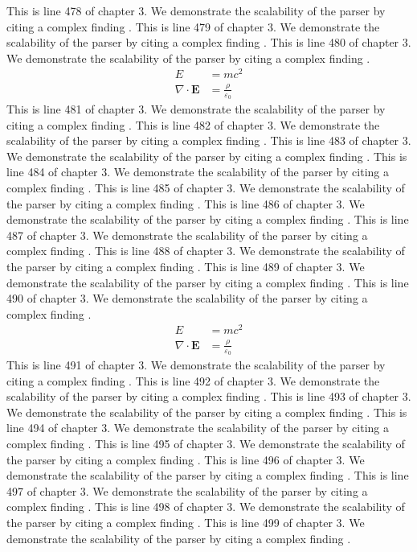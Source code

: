 This is line 478 of chapter 3. We demonstrate the scalability of the parser by citing a complex finding \cite{ref3_478}.
This is line 479 of chapter 3. We demonstrate the scalability of the parser by citing a complex finding \cite{ref3_479}.
This is line 480 of chapter 3. We demonstrate the scalability of the parser by citing a complex finding \cite{ref3_480}.
\begin{align*}
  E &= mc^2 \\
  \nabla \cdot \mathbf{E} &= \frac{\rho}{\varepsilon_0}
\end{align*}
This is line 481 of chapter 3. We demonstrate the scalability of the parser by citing a complex finding \cite{ref3_481}.
This is line 482 of chapter 3. We demonstrate the scalability of the parser by citing a complex finding \cite{ref3_482}.
This is line 483 of chapter 3. We demonstrate the scalability of the parser by citing a complex finding \cite{ref3_483}.
This is line 484 of chapter 3. We demonstrate the scalability of the parser by citing a complex finding \cite{ref3_484}.
This is line 485 of chapter 3. We demonstrate the scalability of the parser by citing a complex finding \cite{ref3_485}.
This is line 486 of chapter 3. We demonstrate the scalability of the parser by citing a complex finding \cite{ref3_486}.
This is line 487 of chapter 3. We demonstrate the scalability of the parser by citing a complex finding \cite{ref3_487}.
This is line 488 of chapter 3. We demonstrate the scalability of the parser by citing a complex finding \cite{ref3_488}.
This is line 489 of chapter 3. We demonstrate the scalability of the parser by citing a complex finding \cite{ref3_489}.
This is line 490 of chapter 3. We demonstrate the scalability of the parser by citing a complex finding \cite{ref3_490}.
\begin{align*}
  E &= mc^2 \\
  \nabla \cdot \mathbf{E} &= \frac{\rho}{\varepsilon_0}
\end{align*}
This is line 491 of chapter 3. We demonstrate the scalability of the parser by citing a complex finding \cite{ref3_491}.
This is line 492 of chapter 3. We demonstrate the scalability of the parser by citing a complex finding \cite{ref3_492}.
This is line 493 of chapter 3. We demonstrate the scalability of the parser by citing a complex finding \cite{ref3_493}.
This is line 494 of chapter 3. We demonstrate the scalability of the parser by citing a complex finding \cite{ref3_494}.
This is line 495 of chapter 3. We demonstrate the scalability of the parser by citing a complex finding \cite{ref3_495}.
This is line 496 of chapter 3. We demonstrate the scalability of the parser by citing a complex finding \cite{ref3_496}.
This is line 497 of chapter 3. We demonstrate the scalability of the parser by citing a complex finding \cite{ref3_497}.
This is line 498 of chapter 3. We demonstrate the scalability of the parser by citing a complex finding \cite{ref3_498}.
This is line 499 of chapter 3. We demonstrate the scalability of the parser by citing a complex finding \cite{ref3_499}.
